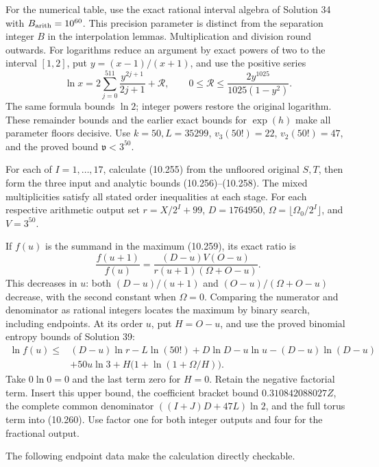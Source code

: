 \documentclass[
  11pt,
  a4paper,
]{article}
\begin{document}
For the numerical table, use the exact rational interval algebra of
Solution 34 with \(B_{\rm arith}=10^{60}\). This precision parameter is
distinct from the separation integer \(B\) in the interpolation lemmas.
Multiplication and division round outwards. For logarithms reduce an
argument by exact powers of two to the interval \([1,2]\), put
\(y=(x-1)/(x+1)\), and use the positive series \[
\ln x=2\sum_{j=0}^{511}\frac{y^{2j+1}}{2j+1}
+\mathcal R,\qquad
0\le\mathcal R\le\frac{2y^{1025}}{1025(1-y^2)}.
\] The same formula bounds \(\ln2\); integer powers restore the original
logarithm. These remainder bounds and the earlier exact bounds for
\(\exp(h)\) make all parameter floors decisive. Use \(k=50,L=35299\),
\(v_3(50!)=22\), \(v_2(50!)=47\), and the proved bound
\(\mathfrak v<3^{50}\).

For each of \(I=1,\ldots,17\), calculate (10.255) from the unfloored
original \(S,T\), then form the three input and analytic bounds
(10.256)--(10.258). The mixed multiplicities satisfy all stated order
inequalities at each stage. For each respective arithmetic output set
\(r=X/2^I+99\), \(D=1764950\), \(\Omega=\lfloor\Omega_0/2^I\rfloor\),
and \(V=3^{50}\).

If \(f(u)\) is the summand in the maximum (10.259), its exact ratio is
\[
\frac{f(u+1)}{f(u)}
=\frac{(D-u)V(O-u)}{r(u+1)(\Omega+O-u)}.
\] This decreases in \(u\): both \((D-u)/(u+1)\) and
\((O-u)/(\Omega+O-u)\) decrease, with the second constant when
\(\Omega=0\). Comparing the numerator and denominator as rational
integers locates the maximum by binary search, including endpoints. At
its order \(u\), put \(H=O-u\), and use the proved binomial entropy
bounds of Solution 39: \[
\begin{aligned}
\ln f(u)\le{}&(D-u)\ln r-L\ln(50!)
+D\ln D-u\ln u-(D-u)\ln(D-u)\\
&+50u\ln3+H\bigl(1+\ln(1+\Omega/H)\bigr).
\end{aligned}
\] Take \(0\ln0=0\) and the last term zero for \(H=0\). Retain the
negative factorial term. Insert this upper bound, the coefficient
bracket bound \(0.310842088027Z\), the complete common denominator
\(((I+J)D+47L)\ln2\), and the full torus term into (10.260). Use factor
one for both integer outputs and four for the fractional output.

The following endpoint data make the calculation directly checkable.
\end{document}
